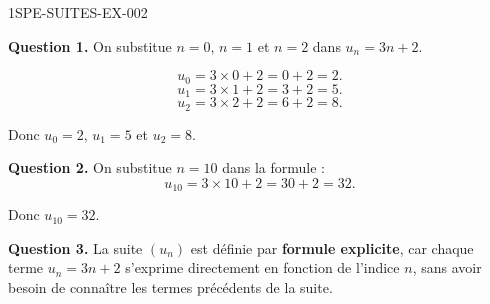 \begin{corrige}{1SPE-SUITES-EX-002}


\textbf{Question 1.} On substitue $n = 0$, $n = 1$ et $n = 2$ dans $u_n = 3n + 2$.

\[
u_0 = 3 \times 0 + 2 = 0 + 2 = 2.
\]
\[
u_1 = 3 \times 1 + 2 = 3 + 2 = 5.
\]
\[
u_2 = 3 \times 2 + 2 = 6 + 2 = 8.
\]

Donc $u_0 = 2$, $u_1 = 5$ et $u_2 = 8$.


\textbf{Question 2.} On substitue $n = 10$ dans la formule :
\[
u_{10} = 3 \times 10 + 2 = 30 + 2 = 32.
\]

Donc $u_{10} = 32$.


\textbf{Question 3.} La suite $(u_n)$ est définie par \textbf{formule explicite}, car chaque terme $u_n = 3n + 2$ s'exprime directement en fonction de l'indice $n$, sans avoir besoin de connaître les termes précédents de la suite.

\end{corrige}
